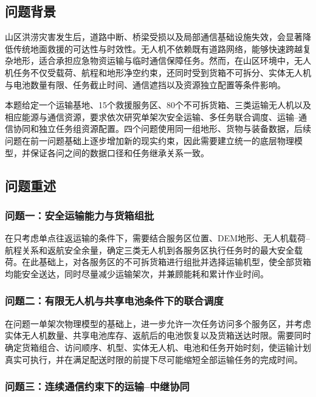 \documentclass[UTF8,a4paper,12pt]{ctexart}
\begin{document}
\subsection{问题背景}

山区洪涝灾害发生后，道路中断、桥梁受损以及局部通信基础设施失效，会显著降低传统地面救援的可达性与时效性。无人机不依赖既有道路网络，能够快速跨越复杂地形，适合承担应急物资运输与临时通信保障任务。然而，在山区环境中，无人机任务不仅受载荷、航程和地形净空约束，还同时受到货箱不可拆分、实体无人机与电池数量有限、任务截止时间、通信遮挡以及资源独立配置等条件影响。

本题给定一个运输基地、15个救援服务区、80个不可拆货箱、三类运输无人机以及相应能源与通信资源，要求依次研究单架次安全运输、多任务联合调度、运输--通信协同和独立任务组资源配置。四个问题使用同一组地形、货物与装备数据，后续问题在前一问题基础上逐步增加新的现实约束，因此需要建立统一的底层物理模型，并保证各问之间的数据口径和任务继承关系一致。

\subsection{问题重述}

\subsubsection{问题一：安全运输能力与货箱组批}

在只考虑单点往返运输的条件下，需要结合服务区位置、DEM地形、无人机载荷--航程关系和返航安全余量，确定三类无人机到各服务区执行任务时的最大安全载荷。在此基础上，对各服务区的不可拆货箱进行组批并选择运输机型，使全部货箱均能安全送达，同时尽量减少运输架次，并兼顾能耗和累计作业时间。

\subsubsection{问题二：有限无人机与共享电池条件下的联合调度}

在问题一单架次物理模型的基础上，进一步允许一次任务访问多个服务区，并考虑实体无人机数量、共享电池库存、返航后的电池恢复以及货箱送达时限。需要同时确定货箱组合、访问顺序、机型、实体无人机、电池和任务开始时刻，使运输计划真实可执行，并在满足配送时限的前提下尽可能缩短全部运输任务的完成时间。

\subsubsection{问题三：连续通信约束下的运输--中继协同}
\end{document}
